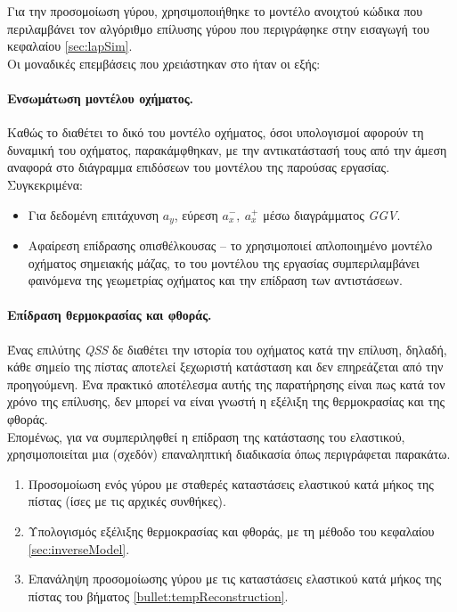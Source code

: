 Για την προσομοίωση γύρου, χρησιμοποιήθηκε το μοντέλο ανοιχτού κώδικα \openLap \cite{halkiopoulos_openlap_fileexchange,halkiopoulos_openlap_github} που περιλαμβάνει τον αλγόριθμο επίλυσης γύρου που περιγράφηκε στην εισαγωγή του κεφαλαίου \ref{sec:lapSim}.\\
\noindent
Οι μοναδικές επεμβάσεις που χρειάστηκαν στο \openLap ήταν οι εξής:

\paragraph{Ενσωμάτωση μοντέλου οχήματος.}
Καθώς το \openLap διαθέτει το δικό του μοντέλο οχήματος, όσοι υπολογισμοί αφορούν τη δυναμική του οχήματος, παρακάμφθηκαν, με την αντικατάστασή τους από την άμεση αναφορά στο διάγραμμα επιδόσεων του μοντέλου της παρούσας εργασίας. Συγκεκριμένα:

\begin{itemize}
    \item Για δεδομένη επιτάχυνση $a_y$, εύρεση $a_{x}^-,\ a_{x}^+$ μέσω διαγράμματος \textit{GGV}.
    \item Αφαίρεση επίδρασης οπισθέλκουσας -- το \openLap χρησιμοποιεί απλοποιημένο μοντέλο οχήματος σημειακής μάζας, το  του μοντέλου της εργασίας συμπεριλαμβάνει φαινόμενα της γεωμετρίας οχήματος και την επίδραση των αντιστάσεων.
\end{itemize}

\paragraph{Επίδραση θερμοκρασίας και φθοράς.}
Ένας επιλύτης \textit{QSS} δε διαθέτει την ιστορία του οχήματος κατά την επίλυση, δηλαδή, κάθε σημείο της πίστας αποτελεί ξεχωριστή κατάσταση και δεν επηρεάζεται από την προηγούμενη. Ένα πρακτικό αποτέλεσμα αυτής της παρατήρησης είναι πως κατά τον χρόνο της επίλυσης, δεν μπορεί να είναι γνωστή η εξέλιξη της θερμοκρασίας και της φθοράς.\\
\noindent
Επομένως, για να συμπεριληφθεί η επίδραση της κατάστασης του ελαστικού, χρησιμοποιείται μια (σχεδόν) επαναληπτική διαδικασία όπως περιγράφεται παρακάτω.

\begin{enumerate}
    \item Προσομοίωση ενός γύρου με σταθερές καταστάσεις ελαστικού κατά μήκος της πίστας (ίσες με τις αρχικές συνθήκες).
    \item Υπολογισμός εξέλιξης θερμοκρασίας και φθοράς, με τη μέθοδο του κεφαλαίου \ref{sec:inverseModel}.
    \label{bullet:tempReconstruction}
    \item Επανάληψη προσομοίωσης γύρου με τις καταστάσεις ελαστικού κατά μήκος της πίστας του βήματος \ref{bullet:tempReconstruction}.
\end{enumerate}

